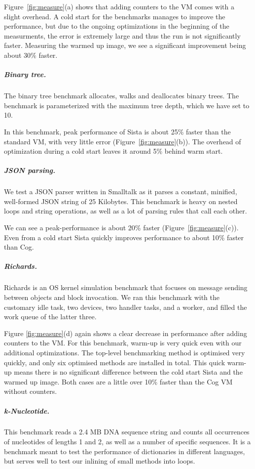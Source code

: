 \documentclass[a4paper,12pt,twoside]{../includes/ThesisStyle}
\begin{document}
Figure~\ref{fig:measure}(a) shows that adding counters to the VM comes with a slight overhead. A cold start for the benchmarks manages to improve the performance, but due to the ongoing optimizations in the beginning of the measurments, the error is extremely large and thus the run is not significantly faster. Measuring the warmed up image, we see a significant improvement being about 30\% faster.                          

\subparagraph{Binary tree.}

The binary tree benchmark allocates, walks and deallocates binary trees. The benchmark is parameterized with  the maximum tree depth, which we have set to 10.

In this benchmark, peak performance of Sista is about 25\% faster than the standard VM, with very little error (Figure~\ref{fig:measure}(b)). The overhead of optimization during a cold start leaves it around 5\% behind warm start.

\subparagraph{JSON parsing.}

We test a JSON parser written in Smalltalk as it parses a constant, minified, well-formed JSON string of 25 Kilobytes. This benchmark is heavy on nested loops and string operations, as well as a lot of parsing rules that call each other.

We can see a peak-performance is about 20\% faster (Figure~\ref{fig:measure}(c)). Even from a cold start Sista quickly improves performance to about 10\% faster than Cog.

\subparagraph{Richards.}

Richards is an OS kernel simulation benchmark that focuses on message sending between objects and block invocation. We ran this benchmark with the customary idle task, two devices, two handler tasks, and a worker, and filled the work queue of the latter three.

Figure \ref{fig:measure}(d) again shows a clear decrease in performance after adding counters to the VM. For this benchmark, warm-up is very quick even with our additional optimizations. The top-level benchmarking method is optimised very quickly, and only six optimised methods are installed in total. This quick warm-up means there is no significant difference between the cold start Sista and the warmed up image. Both cases are a little over 10\% faster than the Cog VM without counters.

\subparagraph{k-Nucleotide.}

This benchmark reads a 2.4 MB DNA sequence string and counts all occurrences of nucleotides of lengths 1 and 2, as well as a number of specific sequences. It is a benchmark meant to test the performance of dictionaries in different languages, but serves well to test our inlining of small methods into loops.
\end{document}
